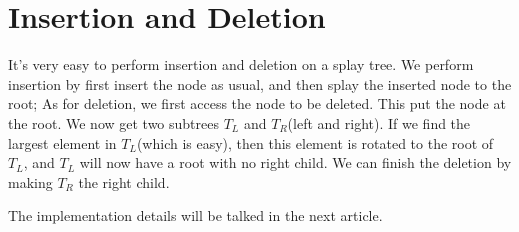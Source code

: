 \documentclass[a4paper,11pt]{article}
\begin{document}
\section{Insertion and Deletion}
It's very easy to perform insertion and deletion on a splay tree. We perform insertion by first insert the node as usual, and then splay the inserted node to the root; As for deletion, we first access the node to be deleted. This put the node at the root. We now get two subtrees $T_L$ and $T_R$(left and right). If we find the largest element in $T_L$(which is easy), then this element is rotated to the root of $T_L$, and $T_L$ will now have a root with no right child. We can finish the deletion by making $T_R$ the right child.

The implementation details will be talked in the next article.
\end{document}
